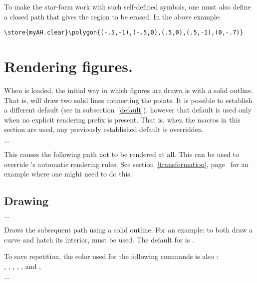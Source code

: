 \documentclass[letterpaper]{article}
\begin{document}
To make the star-form work with such self-defined symbols, one must also
define a closed path  that gives the region to be
erased. In the above example:
\begin{verbatim}
\store{myAH.clear}\polygon{(-.5,-1),(-.5,0),(.5,0),(.5,-1),(0,-.7)}
\end{verbatim}


\section{Rendering figures.}\label{rendering}

When \mfp{} is loaded, the initial way in which figures are drawn is
with a solid outline. That is,  will
draw two solid lines connecting the points. It is possible to establish
a different default (see  in subsection~\ref{default}),
however that default is used only when no explicit rendering prefix is
present. That is, when the macros in this section are used, any
previously established default is overridden.

\begin{cd}
$\ldots$%
%
\end{cd}

This causes the following path not to be rendered at all. This can be
used to override \mfp{}'s automatic rendering rules. See
section~\ref{transformation}, page~\pageref{norenderexample} for an
example where one might need to do this.


\subsection{Drawing}\label{drawing}

\begin{cd}
$\ldots$%
\end{cd}

Draws the subsequent path using a solid outline. For an example: to both
draw a curve and hatch its interior,  must be used.
The default for  is .

To save repetition, the color used for the following commands is also
:\\
, , , , ,
and ,

\begin{cd}
$\ldots$
\end{cd}
\end{document}
